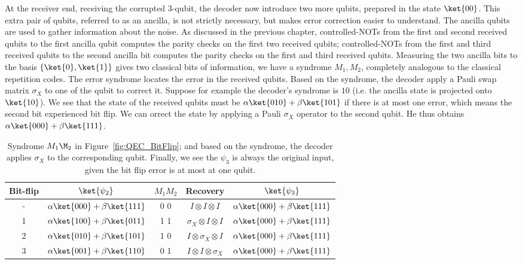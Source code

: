 At the receiver end, receiving the corrupted \(3\)-qubit, the decoder now introduce two more qubits, prepared in the state \(\ket{00}
\). This extra pair of qubits, referred to as an ancilla, is not strictly necessary, but makes error correction easier to understand. The ancilla qubits are used to gather information about the noise. As discussed in the previous chapter, controlled-NOTs from the first and second received qubits to the first ancilla qubit computes the parity checks on the first two received qubits; controlled-NOTs from the first and third received qubits to the second ancilla bit computes the parity checks on the first and third received qubits. Measuring the two ancilla bits to the basis \(\{\ket{0} , \ket{1}\}\) gives two classical bits of information, we have a syndrome \(M_1, M_2\), completely analogous to the classical repetition codes. The error syndrome locates the error in the received qubits. Based on the syndrome, the decoder apply a Pauli swap matrix \(\sigma_X\) to one of the qubit to correct it. Suppose for example the decoder's syndrome is \(10\) (i.e. the ancilla state is projected onto \(\ket{10}\)). We see that the state of the received qubits must be  \(\alpha\ket{010} + \beta \ket{101}\) if there is at most one error, which means the second bit experienced bit flip. We can orrect the state by applying a Pauli \(\sigma_X\) operator to the second qubit. He thus obtains \(\alpha\ket{000} + \beta\ket{111}\).


\begin{table}
\caption{Syndrome \(M_1\M_2\) in Figure~\ref{fig:QEC_BitFlip}; and based on the syndrome, the decoder applies \(\sigma_X\) to the corresponding qubit. Finally, we see the \(\psi_3\) is always the original input, given the bit flip error is at most at one qubit.}
\begin{center}
\begin{tabular}{ |c | c | c | c |c |}
\hline
Bit-flip & \(\ket{\psi_2}\) & \(M_1 M_2\) & Recovery & \(\ket{\psi_3}\) \\
\hline
-  & \(\alpha \ket{000} + \beta\ket{111}\) & 0 0 & \(I \otimes I \otimes I\) & \(\alpha \ket{000} + \beta\ket{111}\) \\ 
1 & \(\alpha \ket{100} + \beta\ket{011}\) & 1 1 & \(\sigma_X \otimes I \otimes I\) & \(\alpha \ket{000} + \beta\ket{111}\)\\
2 & \(\alpha \ket{010} + \beta\ket{101}\) & 1 0 & \(I \otimes \sigma_X \otimes I\) & \(\alpha \ket{000} + \beta\ket{111}\)\\
3 & \(\alpha \ket{001} + \beta\ket{110}\) & 0 1 & \(I  \otimes I \otimes \sigma_X\) & \(\alpha \ket{000} + \beta\ket{111}\)\\
\hline

\end{tabular}
\end{center}
\end{table}


